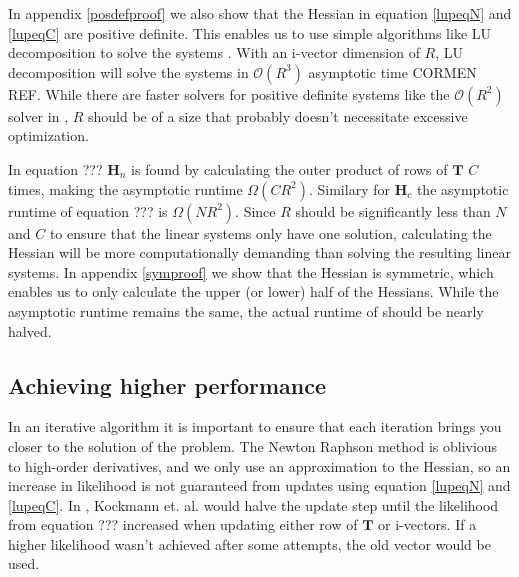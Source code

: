 In appendix \ref{posdefproof} we also show that the Hessian in equation \ref{lupeqN} and \ref{lupeqC} are positive definite. This enables us to use simple algorithms like LU decomposition to solve the systems \cite[p. 749]{cormen}. With an i-vector dimension of $R$, LU decomposition will solve the systems in $\mathcal{O}(R^3)$ asymptotic time CORMEN REF. While there are faster solvers for positive definite systems like the $\mathcal{O}(R^2)$ solver in \cite{tewfik1994fast}, $R$ should be of a size that probably doesn't necessitate excessive optimization.

In equation ??? $\mathbf{H}_n$ is found by calculating the outer product of rows of $\mathbf{T}$ $C$ times, making the asymptotic runtime $\Omega(CR^2)$. Similary for $\mathbf{H}_c$ the asymptotic runtime of equation ??? is  $\Omega(NR^2)$. Since $R$ should be significantly less than $N$ and $C$ to ensure that the linear systems only have one solution, calculating the Hessian will be more computationally demanding than solving the resulting linear systems. In appendix \ref{symproof} we show that the Hessian is symmetric, which enables us to only calculate the upper (or lower) half of the Hessians. While the asymptotic runtime remains the same, the actual runtime of should be nearly halved. 

\subsection{Achieving higher performance}

In an iterative algorithm it is important to ensure that each iteration brings you closer to the solution of the problem. The Newton Raphson method is oblivious to high-order derivatives, and we only use an approximation to the Hessian, so an increase in likelihood is not guaranteed from updates using equation \ref{lupeqN} and \ref{lupeqC}. In \cite{kockmann2010prosodic}, Kockmann et. al. would halve the update step until the likelihood from equation ??? increased when updating either row of $\mathbf{T}$ or i-vectors. If a higher likelihood wasn't achieved after some attempts, the old vector would be used.  

